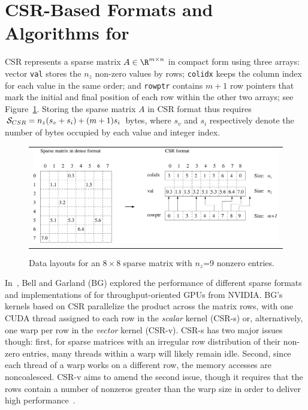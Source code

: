\section{CSR-Based Formats and Algorithms for \spmv}
\label{sec:spmv}


CSR represents a sparse matrix $A \in \R^{m \times n}$ in compact form
using three arrays:
vector {\tt val} stores the $n_z$ non-zero values by rows;
{\tt colidx} keeps the column index for each value in the same order;
and {\tt rowptr} contains $m+1$ row pointers that mark the initial
and final position of each row within the other two arrays;
see Figure~\ref{2017-csr-spmv:fig:spmv}.
Storing the sparse matrix $A$ in CSR format thus requires ${\cal S}_{CSR} = n_z(s_v+s_i)+(m+1)s_i$ bytes, where
$s_v$ and $s_i$ respectively denote the number of bytes occupied 
by each value and integer index.

\begin{figure}[t]
\begin{tabular}{c}
\begin{minipage}{\textwidth}
\begin{center}
\includegraphics[width=\textwidth]{plots/csr_format}
\end{center}
\end{minipage}
\end{tabular}
\caption{Data layouts
for an $8 \times 8$ sparse matrix with $n_z$=9 nonzero entries.}
\label{2017-csr-spmv:fig:spmv}
\end{figure}

In~\cite{Bell:SpMV:NVIDIA:2008}, Bell and Garland (BG) explored the performance
of different sparse formats and implementations of \spmv for throughput-oriented GPUs from NVIDIA.
BG's \spmv kernels based on CSR
parallelize the product
across the matrix rows,
with one CUDA thread assigned to each row in the {\em scalar} kernel (CSR-s) or,
alternatively, one warp per row in the {\em vector} kernel (CSR-v).
CSR-s has two major issues though: first, for sparse matrices with an
irregular row distribution of their non-zero entries,
many threads within a warp will likely remain idle.
Second, since each thread of a warp works on a different row,
the memory accesses are noncoalesced.
CSR-v aims to amend the second issue,
though it
requires that the rows contain a number of nonzeros greater than the warp
size in order to deliver high performance~\cite{Bell:SpMV:NVIDIA:2008}.

